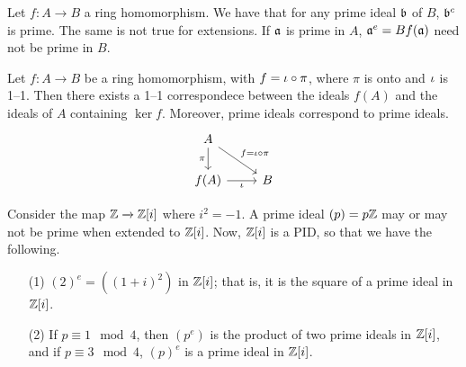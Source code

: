 \begin{example}\label{example_1.16}
    Let $f:A \xrightarrow{} B$ a ring homomorphism. We have that for any prime
    ideal $\bf$ of $B$, $\bf^c$ is prime. The same is not true for extensions.
    If $\af$ is prime in $A$,  $\af^e=Bf(\af)$ need not be prime in $B$.
\end{example}

\begin{lemma}\label{1.10.3}
    Let $f:A \xrightarrow{} B$ be a ring homomorphism, with $f=\i \circ \pi$,
    where  $\pi$ is onto and  $\i$ is 1--1. Then there exists a 1--1
    correspondece between the ideals $f(A)$ and the ideals of $A$ containing
     $\ker{f}$. Moreover, prime ideals correspond to prime ideals.
     \[\begin{tikzcd}
        A \\
        {f(A)} & B
        \arrow["\pi"', from=1-1, to=2-1]
        \arrow["\iota"', from=2-1, to=2-2]
        \arrow["{f=\iota \circ \pi}", from=1-1, to=2-2]
      \end{tikzcd}\]
\end{lemma}

\begin{example}\label{example_1.17}
    Consider the map $\Z \xrightarrow{} \Z[i]$ where $i^2=-1$. A prime ideal
    $(p)=p\Z$ may or may not be prime when extended to $\Z[i]$. Now, $\Z[i]$ is
        a PID, so that we have the following.
        \begin{enumerate}
            \item[(1)] $(2)^e=((1+i)^2)$ in $\Z[i]$; that is, it is the square
                of a prime ideal in $\Z[i]$.

            \item[(2)] If $p \equiv 1 \mod{4}$, then $(p^e)$ is the product of
                two prime ideals in $\Z[i]$, and if $p \equiv 3 \mod{4}$,
                $(p)^e$ is a prime ideal in $\Z[i]$.
        \end{enumerate}
\end{example}

